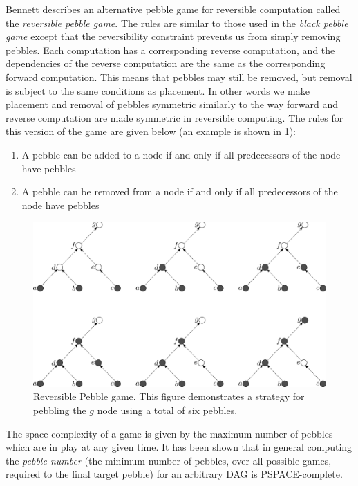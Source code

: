Bennett\cite{Bennett:89} describes an alternative pebble game for reversible
computation called the \emph{reversible pebble game}. The rules are similar to
those used in the \emph{black pebble game} except that the reversibility
constraint prevents us from simply removing pebbles. Each computation has a
corresponding reverse computation, and the dependencies of the reverse
computation are the same as the corresponding forward computation. This means
that pebbles may still be removed, but removal is subject to the same
conditions as placement. In other words we make placement and removal of
pebbles symmetric similarly to the way forward and reverse computation are made
symmetric in reversible computing.  The rules for this version of the game are
given below (an example is shown in \cref{fig:rev-peb-game}):

\begin{enumerate}

  \item A pebble can be added to a node if and only if all predecessors of the
    node have pebbles

  \item A pebble can be removed from a node if and only if all predecessors of
    the node have pebbles

\end{enumerate}

\begin{figure}
      \capstart
      \centering
      \includegraphics[width=0.9\hsize]{images/rev-peb-game}

      \caption{Reversible Pebble game. This figure demonstrates a strategy for
      pebbling the $g$ node using a total of six pebbles.}

      \label{fig:rev-peb-game}
\end{figure}

The space complexity of a game is given by the maximum number of pebbles which
are in play at any given time. It has been shown that in general computing the
\emph{pebble number} (the minimum number of pebbles, over all possible games,
required to the final target pebble) for an arbitrary DAG is
PSPACE-complete\cite{chan13}\footnotemark.


